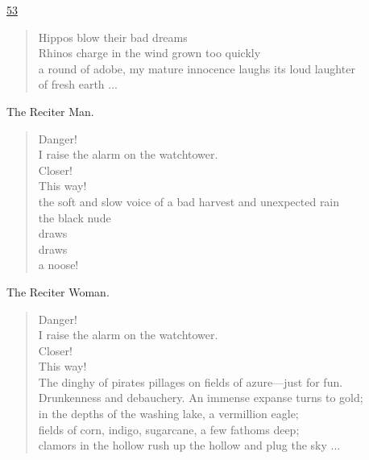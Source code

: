 \documentclass[letterpaper,article,12pt,oneside,notitlepage]{memoir}
\begin{document}
\clearpage

\href{http://cesaire.elotroalex.com/chiens/chiens/p053.html}{53}

\begin{verse}
Hippos blow their bad dreams \\
Rhinos charge in the wind grown too quickly \\
a round of adobe, my mature innocence laughs its loud laughter \\
of fresh earth ... \\
\end{verse}

\begin{center}The Reciter Man.\end{center}

\begin{verse}
Danger! \\
I raise the alarm on the watchtower. \\
Closer! \\
This way! \\
the soft and slow voice of a bad harvest and unexpected rain \\
the black nude \\
draws \\
draws \\
a noose! \\
\end{verse}

\begin{center}The Reciter Woman.\end{center}

\begin{verse}
Danger! \\
I raise the alarm on the watchtower. \\
Closer! \\
This way! \\
The dinghy of pirates pillages on fields of azure---just for fun. \\
Drunkenness and debauchery. An immense expanse turns to gold; \\
in the depths of the washing lake, a vermillion eagle; \\
fields of corn, indigo, sugarcane, a few fathoms deep; \\
clamors in the hollow rush up the hollow and plug the sky ... \\
\end{verse}

\clearpage
\end{document}
